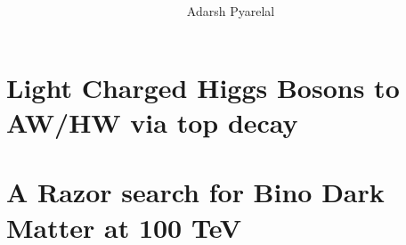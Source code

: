 \documentclass[final,twoside,10pt]{memoir}
\title{\scshape\color{Maroon}{\MakeTextLowercase{Searches for New Physics at Colliders}}}
\author{Adarsh Pyarelal}
\date{}
\theoremstyle{definition}
\theoremstyle{theorem}
\begin{document}




\cleardoublepage
\tableofcontents*
\cleardoublepage
\listoffigures*
\cleardoublepage
\listoftables*
\cleardoublepage








\appendix
\appendixpage



\chapter{Light Charged Higgs Bosons to AW/HW via top decay}
%
\chapter{A Razor search for Bino Dark Matter at 100 TeV}
%
\printbibliography

\end{document}
